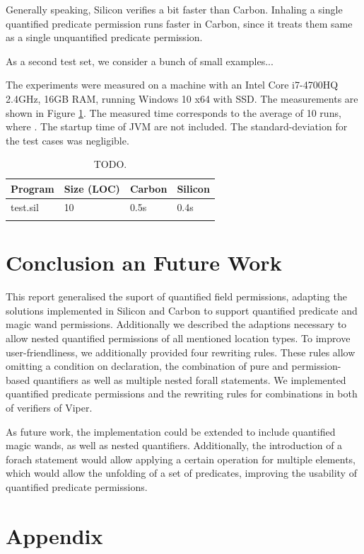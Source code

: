 \documentclass[12pt]{article}
\begin{document}
Generally speaking, Silicon verifies a bit faster than Carbon. Inhaling a single quantified predicate permission runs faster in Carbon, since it treats them same as a single unquantified predicate permission.

As a second test set, we consider a bunch of small examples...

The experiments were measured on a machine with an Intel Core i7-4700HQ 2.4GHz, 16GB RAM, running Windows 10 x64 with SSD. The measurements are shown in Figure \ref{timings}. The measured time corresponds to the average of 10 runs, where . The startup time of JVM are not included. The standard-deviation for the test cases was negligible.

\begin{longtable}{ | p{} | p{}| p{} | p{}|}
\hline
{\bf Program} & {\bf Size (LOC)} & {\bf Carbon}&  {\bf Silicon} \\ \hline
test.sil & 10 & 0.5s & 0.4s \\
\hline
\caption[run-time measurements]
   {TODO.}
\label{timings}
\end{longtable}

\section{Conclusion an Future Work}
This report generalised the suport of quantified field permissions, adapting the solutions implemented in Silicon and Carbon to support quantified predicate and magic wand permissions. Additionally we described the adaptions necessary to allow nested quantified permissions of all mentioned location types. To improve user-friendliness, we additionally provided four rewriting rules. These rules allow omitting a condition on declaration, the combination of pure and permission-based quantifiers as well as multiple nested forall statements. We implemented quantified predicate permissions and the rewriting rules for combinations in both of verifiers of Viper.

As future work, the implementation could be extended to include quantified magic wands, as well as nested quantifiers. Additionally, the introduction of a forach statement would allow applying a certain operation for multiple elements, which would allow the unfolding of a set of predicates, improving the usability of quantified predicate permissions.



\newpage
\section{Appendix}
\end{document}
